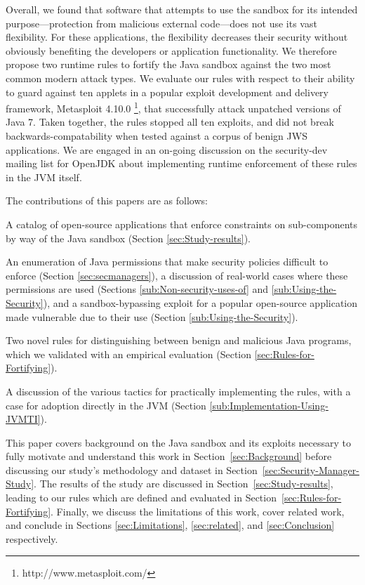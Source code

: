 \documentclass{sig-alternate}
\begin{document}
Overall, we found that software that attempts to use the sandbox for its intended
purpose---protection from malicious external code---does not use its
vast flexibility.  For these applications, the flexibility decreases their security without
obviously benefiting the developers or application functionality.  We therefore propose 
two runtime rules to fortify the Java
sandbox against the two most common modern attack types. We evaluate our rules
with respect to their ability to guard against ten applets in a popular exploit development 
and delivery framework, Metasploit
4.10.0%
\footnote{http://www.metasploit.com/}, that successfully attack unpatched
versions of Java 7. 
Taken together, the rules stopped all ten exploits, and did not break
backwards-compatability 
when tested against a corpus of benign JWS applications.
We are engaged in an
on-going discussion on the security-dev mailing list for OpenJDK about
implementing runtime enforcement of these rules in the JVM itself.

The contributions of this papers are as follows:
\begin{flushitem}	\setlength{\parskip}{0pt}
  \setlength{\parsep}{0pt}
  \setlength{\itemsep}{0pt}
\item A catalog of open-source applications that enforce constraints on
  sub-components by way of the Java sandbox (Section \ref{sec:Study-results}).
\item An enumeration of Java permissions that make security policies difficult
  to enforce (Section \ref{sec:secmanagers}), a discussion of real-world cases
  where these permissions are used (Sections \ref{sub:Non-security-uses-of} and
  \ref{sub:Using-the-Security}), and a sandbox-bypassing exploit for a popular
  open-source application made vulnerable due to their use (Section
  \ref{sub:Using-the-Security}).
\item Two novel rules for distinguishing between benign and malicious Java
  programs, which we validated with an empirical evaluation (Section
  \ref{sec:Rules-for-Fortifying}).
\item A discussion of the various tactics for practically implementing the
  rules, with a case for adoption directly in the JVM (Section
  \ref{sub:Implementation-Using-JVMTI}).
\end{flushitem}

This paper covers background on the Java sandbox and its exploits necessary to fully motivate and understand this work in Section~\ref{sec:Background} before discussing our study's methodology and dataset in Section~\ref{sec:Security-Manager-Study}. The results of the study are discussed in Section~\ref{sec:Study-results}, leading to our rules which are defined and evaluated in Section~\ref{sec:Rules-for-Fortifying}. Finally, we discuss the limitations of this work, cover related work, and conclude in Sections \ref{sec:Limitations}, \ref{sec:related}, and \ref{sec:Conclusion} respectively.
\end{document}
